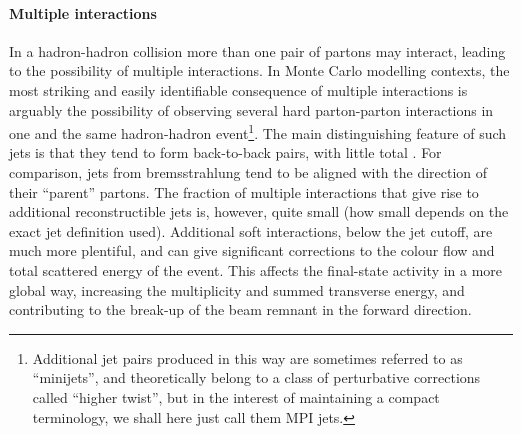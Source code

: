 \paragraph{Multiple interactions}
In a hadron-hadron collision more than one pair of partons may
interact, leading to the possibility of multiple interactions.
In Monte Carlo modelling contexts, the most striking and easily
identifiable consequence of multiple interactions is arguably
the possibility of observing several hard parton-parton 
interactions in one and the same hadron-hadron event\footnote{
Additional jet pairs produced in this way are sometimes
referred to as ``minijets'', and theoretically belong to a class of
perturbative  corrections called ``higher twist'', but in the interest
of maintaining a compact terminology, we shall here just call them MPI
jets.}. The main distinguishing feature of such jets is that they tend to form 
back-to-back pairs, with little total \pt. For comparison, jets from 
bremsstrahlung tend to be aligned with the direction of their
``parent'' partons. The fraction of multiple interactions that give
rise to additional reconstructible jets is, however, quite small (how
small depends on the exact jet definition used). 
Additional soft interactions, below the
jet cutoff, are much more plentiful, and can give significant
corrections to the colour flow and total scattered energy 
of the event. 
This affects the final-state activity in a more global way, increasing the
multiplicity and summed transverse energy, and contributing to the
break-up of the beam remnant in the forward direction. 


